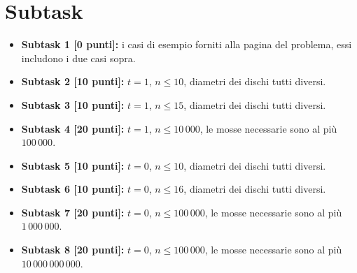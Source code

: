 \section*{Subtask}

  \begin{itemize}
    \item \textbf{Subtask 1 [0 punti]:} i casi di esempio forniti alla pagina del problema, essi includono i due casi sopra.
    \item \textbf{Subtask 2 [10 punti]:} $t=1$, $n \le 10$, diametri dei dischi tutti diversi.
    \item \textbf{Subtask 3 [10 punti]:} $t=1$, $n \le 15$, diametri dei dischi tutti diversi.
    \item \textbf{Subtask 4 [20 punti]:} $t=1$, $n \le 10\,000$, le mosse necessarie sono al più $100\,000$.
    \item \textbf{Subtask 5 [10 punti]:} $t=0$, $n \le 10$, diametri dei dischi tutti diversi.
    \item \textbf{Subtask 6 [10 punti]:} $t=0$, $n \le 16$, diametri dei dischi tutti diversi.
    \item \textbf{Subtask 7 [20 punti]:} $t=0$, $n \le 100\,000$, le mosse necessarie sono al più $1\,000\,000$.
    \item \textbf{Subtask 8 [20 punti]:} $t=0$, $n \le 100\,000$, le mosse necessarie sono al più $10\,000\,000\,000$.
  \end{itemize}
  
